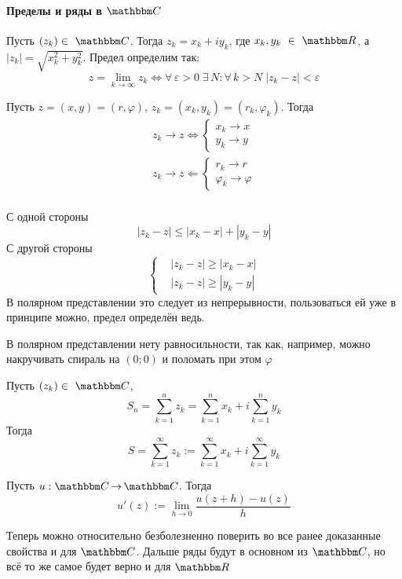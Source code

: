 \documentclass[12pt]{../../notes}
\begin{document}
\paragraph{Пределы и ряды в \texorpdfstring{$\C$}{}}
\begin{defn}\label{defn:complim}
  Пусть $(z_k)\in~\C$. Тогда $z_k = x_k + i y_k$, где $x_k,y_k~\in~\R$, а $|z_k|=\sqrt{x_k^2+y_k^2}$.
  Предел определим так:
  \[
    z = \lim_{k\to \infty} z_k \Leftrightarrow \forall\,\varepsilon > 0 \; \exists\, N \colon 
    \forall\, k > N \; |z_k - z| < \varepsilon
  \]
\end{defn}
\begin{thrm}\label{thrm:compcoordlim}
  Пусть $z=(x,y) = (r,\varphi)$, $z_k = (x_k, y_k) = (r_k, \varphi_k)$. Тогда
  \begin{align*}
    z_k \to z \Leftrightarrow \begin{cases} x_k\to x \\ y_k\to y \end{cases} \\
    z_k \to z \Leftarrow \begin{cases} r_k\to r \\ \varphi_k\to \varphi \end{cases} \\
  \end{align*}
\end{thrm}
\begin{ittproof}
  С одной стороны 
  \[
    |z_k - z| \leqslant |x_k - x| + |y_k - y| 
  \]
  С другой стороны
  \[
    \begin{cases}
      &|z_k - z| \geqslant |x_k - x| \\
      &|z_k - z| \geqslant |y_k - y|
    \end{cases}
  \]
  В полярном представлении это следует из непрерывности, пользоваться ей уже в принципе можно, предел
  определён ведь.
\end{ittproof}
\begin{rem*}
  В полярном представлении нету равносильности, так как, например, можно накручивать спираль на $(0;0)$
  и поломать при этом $\varphi$
\end{rem*}
\begin{defn}\label{defn:compseries}
  Пусть $(z_k)\in~\C$, 
  \[
      S_n = \sum_{k=1}^{n} z_k = \sum_{k=1}^{n} x_k + i \sum_{k=1}^{n} y_k
  \]
  Тогда
  \[
      S = \sum_{k=1}^{\infty} z_k := \sum_{k=1}^{\infty} x_k + i \sum_{k=1}^{\infty} y_k  
  \]
\end{defn}
\begin{defn}\label{defn:complderiv}
  Пусть $u: \C \to \C$. Тогда
  \[
    u'(z) := \lim_{h\to 0} \frac{u(z+h) - u(z)}{h}
  \]
\end{defn}
Теперь можно относительно безболезненно поверить во все ранее доказанные свойства и для $\C$.
Дальше ряды будут в основном из $\C$, но всё то же самое будет верно и для $\R$
\end{document}
